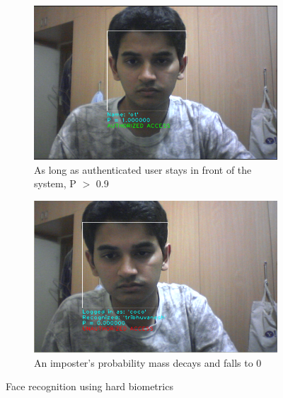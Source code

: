 \documentclass[12pt]{article}			%
\begin{document}
\begin{figure}[t]
        \begin{subfigure}[b]{0.5\textwidth}
                \centering
                \includegraphics[scale=0.35]{img/hard1.png}
                \caption{As long as authenticated user stays in front of the system, P $>$ 0.9}
                \label{fig:hard1}
        \end{subfigure}%
        \begin{subfigure}[b]{0.5\textwidth}
                \centering
                \includegraphics[scale=0.35]{img/unauth3.png}
                \caption{An imposter's probability mass decays and falls to 0}
                \label{fig:pwd2}
        \end{subfigure}
        \caption{Face recognition using hard biometrics}\label{fig:pwd}
\end{figure}
\end{document}
